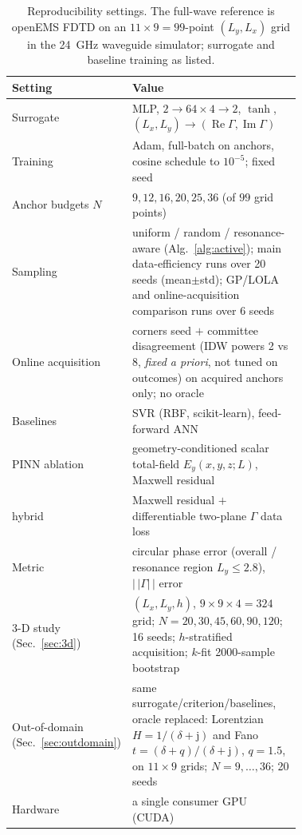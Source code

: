 \documentclass[11pt]{article}
\newcommand{\im}{\mathrm{j}}
\begin{document}
\begin{table}[!ht]\centering\small
\caption{Reproducibility settings. The full-wave reference is openEMS FDTD on an $11\times9=99$-point
$(L_y,L_x)$ grid in the \SI{24}{GHz} waveguide simulator; surrogate and baseline training as listed.}
\label{tab:repro}
\begin{tabular}{@{}l p{0.72\linewidth}@{}}
\toprule
Setting & Value \\
\midrule
Surrogate & MLP, $2\!\to\!64\!\times\!4\!\to\!2$, $\tanh$, $(L_x,L_y)\!\to\!(\operatorname{Re}\Gamma,\operatorname{Im}\Gamma)$ \\
Training & Adam, full-batch on anchors, cosine schedule to $10^{-5}$; fixed seed \\
Anchor budgets $N$ & $9,12,16,20,25,36$ (of $99$ grid points) \\
Sampling & uniform / random / resonance-aware (Alg.~\ref{alg:active}); main data-efficiency runs over 20 seeds (mean$\pm$std); GP/LOLA and online-acquisition comparison runs over 6 seeds \\
Online acquisition & corners seed $+$ committee disagreement (IDW powers 2 vs 8, \emph{fixed a priori}, not tuned on outcomes) on acquired anchors only; no oracle \\
Baselines & SVR (RBF, scikit-learn), feed-forward ANN \\
PINN ablation & geometry-conditioned scalar total-field $E_y(x,y,z;L)$, Maxwell residual \\
\quad hybrid & Maxwell residual $+$ differentiable two-plane $\Gamma$ data loss \\
Metric & circular phase error (overall / resonance region $L_y\!\le\!2.8$), $\lvert\,|\Gamma|\,\rvert$ error \\
3-D study (Sec.~\ref{sec:3d}) & $(L_x,L_y,h)$, $9\!\times\!9\!\times\!4\!=\!324$ grid; $N\!=\!20,30,45,60,90,120$; 16 seeds; $h$-stratified acquisition; $k$-fit 2000-sample bootstrap \\
Out-of-domain (Sec.~\ref{sec:outdomain}) & same surrogate/criterion/baselines, oracle replaced: Lorentzian $H\!=\!1/(\delta+\im)$ and Fano $t\!=\!(\delta+q)/(\delta+\im)$, $q\!=\!1.5$, on $11\!\times\!9$ grids; $N\!=\!9,\dots,36$; 20 seeds \\
Hardware & a single consumer GPU (CUDA) \\
\bottomrule
\end{tabular}
\end{table}
\end{document}
